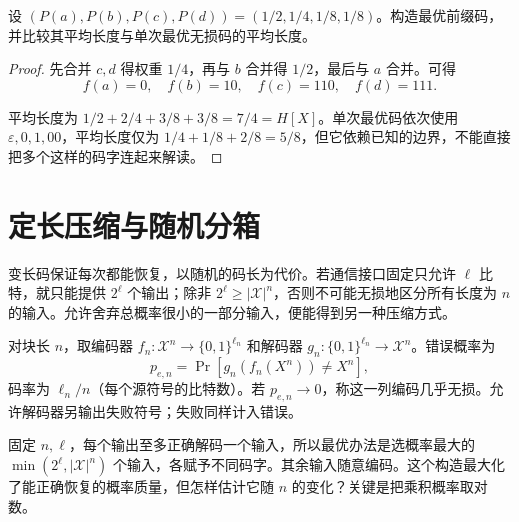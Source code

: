 \documentclass[lang=cn,a4paper,fontset=none,zihao=false,10pt,openany,twoside]{beautybook}
\numberwithin{algorithm}{chapter}
\begin{document}
\begin{example}[从合并权重读出码字]
设 $(P(a),P(b),P(c),P(d))=(1/2,1/4,1/8,1/8)$。构造最优前缀码，并比较其平均长度与单次最优无损码的平均长度。
\end{example}
\begin{proof}
先合并 $c,d$ 得权重 $1/4$，再与 $b$ 合并得 $1/2$，最后与 $a$ 合并。可得
\[
 f(a)=0,\quad f(b)=10,\quad f(c)=110,\quad f(d)=111.
\]
\begin{center}
\end{center}
平均长度为 $1/2+2/4+3/8+3/8=7/4=H[X]$。单次最优码依次使用 $\varepsilon,0,1,00$，平均长度仅为 $1/4+1/8+2/8=5/8$，但它依赖已知的边界，不能直接把多个这样的码字连起来解读。
\end{proof}

\section{定长压缩与随机分箱}\label{sec:fixed-coding}
变长码保证每次都能恢复，以随机的码长为代价。若通信接口固定只允许 $\ell$ 比特，就只能提供 $2^\ell$ 个输出；除非 $2^\ell\ge|\mathcal X|^n$，否则不可能无损地区分所有长度为 $n$ 的输入。允许舍弃总概率很小的一部分输入，便能得到另一种压缩方式。
\begin{definition}[几乎无损的定长块编码]\label{def:almost-lossless}
对块长 $n$，取编码器 $f_n:\mathcal X^n\to\{0,1\}^{\ell_n}$ 和解码器 $g_n:\{0,1\}^{\ell_n}\to\mathcal X^n$。错误概率为
\[
 p_{e,n}=\Pr[g_n(f_n(X^n))\ne X^n],
\]
码率为 $\ell_n/n$（每个源符号的比特数）。若 $p_{e,n}\to0$，称这一列编码几乎无损。允许解码器另输出失败符号；失败同样计入错误。
\end{definition}
固定 $n,\ell$，每个输出至多正确解码一个输入，所以最优办法是选概率最大的 $\min(2^\ell,|\mathcal X|^n)$ 个输入，各赋予不同码字。其余输入随意编码。这个构造最大化了能正确恢复的概率质量，但怎样估计它随 $n$ 的变化？关键是把乘积概率取对数。
\end{document}
